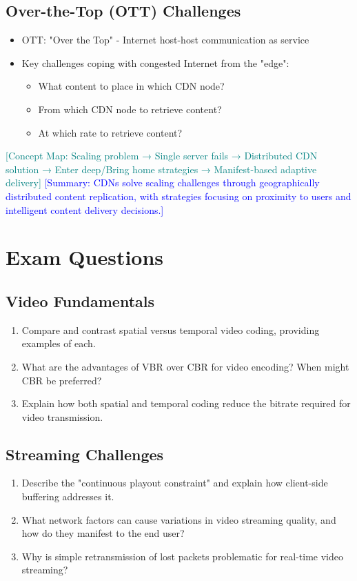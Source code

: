 \documentclass[12pt]{article}
\begin{document}
\subsection{Over-the-Top (OTT) Challenges}
\begin{itemize}
    \item OTT: "Over the Top" - Internet host-host communication as service
    \item Key challenges coping with congested Internet from the "edge":
          \begin{itemize}
              \item What content to place in which CDN node?
              \item From which CDN node to retrieve content?
              \item At which rate to retrieve content?
          \end{itemize}
\end{itemize}

\textcolor{teal}{[Concept Map: Scaling problem → Single server fails → Distributed CDN solution → Enter deep/Bring home strategies → Manifest-based adaptive delivery]}
\textcolor{blue}{[Summary: CDNs solve scaling challenges through geographically distributed content replication, with strategies focusing on proximity to users and intelligent content delivery decisions.]}

\section*{Exam Questions}

\subsection*{Video Fundamentals}
\begin{enumerate}
    \item Compare and contrast spatial versus temporal video coding, providing examples of each.
    \item What are the advantages of VBR over CBR for video encoding? When might CBR be preferred?
    \item Explain how both spatial and temporal coding reduce the bitrate required for video transmission.
\end{enumerate}

\subsection*{Streaming Challenges}
\begin{enumerate}
    \item Describe the "continuous playout constraint" and explain how client-side buffering addresses it.
    \item What network factors can cause variations in video streaming quality, and how do they manifest to the end user?
    \item Why is simple retransmission of lost packets problematic for real-time video streaming?
\end{enumerate}
\end{document}
